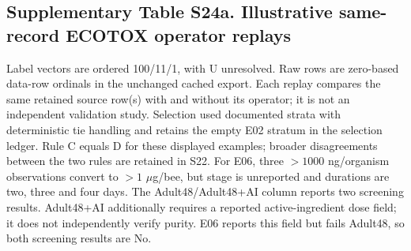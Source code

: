 \subsection*{Supplementary Table S24a. Illustrative same-record ECOTOX operator replays}

Label vectors are ordered 100/11/1, with U unresolved. Raw rows are zero-based data-row ordinals in the unchanged cached export. Each replay compares the same retained source row(s) with and without its operator; it is not an independent validation study. Selection used documented strata with deterministic tie handling and retains the empty E02 stratum in the selection ledger. Rule C equals D for these displayed examples; broader disagreements between the two rules are retained in S22. For E06, three $>1000$ ng/organism observations convert to $>1$ $\mu$g/bee, but stage is unreported and durations are two, three and four days. The Adult48/Adult48+AI column reports two screening results. Adult48+AI additionally requires a reported active-ingredient dose field; it does not independently verify purity. E06 reports this field but fails Adult48, so both screening results are No.

\begingroup\small\setlength{\tabcolsep}{4pt}


